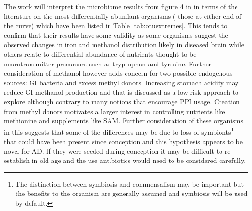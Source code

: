 \documentclass[aps,secnumarabic,balancelastpage,amsmath,amssymb,nofootinbib]{revtex4}
\newcommand{\mjmreftab}[1]{Table  \ref{tab:#1}}
\begin{document}
The work will  interpret the microbiome results
from figure 4 in \cite{10.3389/fcimb.2023.1123228} 
in terms of the literature on the most differentially abundant
organisms ( those at either end of the curve)
which have been listed in \mjmreftab{otuextremes}.
This tends to confirm that their results have some validity
as some organisms suggest the observed changes in iron and
methanol distribution likely in diseased brain while
others relate to differential abundance of nutrients
thought to be neurotransmitter precursors such as
tryptophan and tyrosine. Further consideration of methanol
however adds concern for  two possible endogenous sources:
GI bacteria and excess methyl donors. 
Increasing stomach acidity may reduce GI methanol
production and that is discussed as a low
risk approach to explore although contrary to
many notions that encourage PPI usage. 
Creation from methyl donors
motivates a larger interest in controlling nutrients like 
methionine and supplements like SAM.  
Further consideration  of these organisms in this  
suggests that some of the differences may be due to loss of
symbionts\footnote{ The distinction between symbiosis and commensalism may be important but the benefits to the organism are generally assumed and symbiosis will be used by default. } 
 that could have been present since conception
and this hypothesis appears to be novel for AD.
If they were seeded during conception it may be difficult
to re-establish in old age and the use antibiotics would
need to be considered carefully. 


\begin{comment}
ir utility
for measuring properties of the CNS  environment such as nutritional
status with only incidental contributions to disease progression.
The work suggests the evidence largely supports an infectious
etiology but I try to show here that in fact the microbes
may be making an exceelent relevant measurement of nutrient
status in the brain. Some of the properties of the differentially
abundant organisms however do suggest way in which they may
assist or impair brain function by their presence.  
The authors produced a minimally processed list of OTU's that
differed in some ways between disease and control samples
and they tabulated the most extreme differences in the text
which is reproduced below, \mjmreftab{otuextremes}.

\end{comment}
\end{document}
